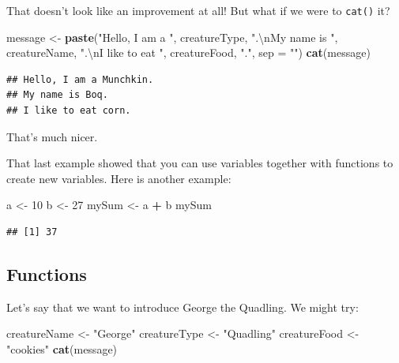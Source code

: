 \documentclass[]{book}
\makeatletter
\newenvironment{Shaded}{\begin{snugshade}}{\end{snugshade}}
\newcommand{\KeywordTok}[1]{\textcolor[rgb]{0.13,0.29,0.53}{\textbf{#1}}}
\newcommand{\DataTypeTok}[1]{\textcolor[rgb]{0.13,0.29,0.53}{#1}}
\newcommand{\DecValTok}[1]{\textcolor[rgb]{0.00,0.00,0.81}{#1}}
\newcommand{\CharTok}[1]{\textcolor[rgb]{0.31,0.60,0.02}{#1}}
\newcommand{\StringTok}[1]{\textcolor[rgb]{0.31,0.60,0.02}{#1}}
\newcommand{\OperatorTok}[1]{\textcolor[rgb]{0.81,0.36,0.00}{\textbf{#1}}}
\newcommand{\NormalTok}[1]{#1}
\newenvironment{kframe}{%
\medskip{}
\setlength{\fboxsep}{.8em}
 \def\at@end@of@kframe{}%
 \ifinner\ifhmode%
  \def\at@end@of@kframe{\end{minipage}}%
  \begin{minipage}{\columnwidth}%
 \fi\fi%
 \def\FrameCommand##1{\hskip\@totalleftmargin \hskip-\fboxsep
 \colorbox{shadecolor}{##1}\hskip-\fboxsep
     \hskip-\linewidth \hskip-\@totalleftmargin \hskip\columnwidth}%
 \MakeFramed {\advance\hsize-\width
   \@totalleftmargin\z@ \linewidth\hsize
   \@setminipage}}%
 {\par\unskip\endMakeFramed%
 \at@end@of@kframe}
\renewenvironment{Shaded}{\begin{kframe}}{\end{kframe}}
\theoremstyle{definition}
\theoremstyle{definition}
\theoremstyle{definition}
\theoremstyle{remark}
\makeatother
\begin{document}
That doesn't look like an improvement at all! But what if we were to
\texttt{cat()} it?

\begin{Shaded}
\begin{Highlighting}[]
\NormalTok{message <-}\StringTok{ }\KeywordTok{paste}\NormalTok{(}\StringTok{"Hello, I am a "}\NormalTok{,}
\NormalTok{                 creatureType,}
                 \StringTok{".}\CharTok{\textbackslash{}n}\StringTok{My name is "}\NormalTok{,}
\NormalTok{                 creatureName,}
                 \StringTok{".}\CharTok{\textbackslash{}n}\StringTok{I like to eat "}\NormalTok{,}
\NormalTok{                 creatureFood,}
                 \StringTok{"."}\NormalTok{,}
                 \DataTypeTok{sep =} \StringTok{""}\NormalTok{)}
\KeywordTok{cat}\NormalTok{(message)}
\end{Highlighting}
\end{Shaded}

\begin{verbatim}
## Hello, I am a Munchkin.
## My name is Boq.
## I like to eat corn.
\end{verbatim}

That's much nicer.

That last example showed that you can use variables together with
functions to create new variables. Here is another example:

\begin{Shaded}
\begin{Highlighting}[]
\NormalTok{a <-}\StringTok{ }\DecValTok{10}
\NormalTok{b <-}\StringTok{ }\DecValTok{27}
\NormalTok{mySum <-}\StringTok{ }\NormalTok{a }\OperatorTok{+}\StringTok{ }\NormalTok{b}
\NormalTok{mySum}
\end{Highlighting}
\end{Shaded}

\begin{verbatim}
## [1] 37
\end{verbatim}

\subsection{Functions}\label{idea-functions}

Let's say that we want to introduce George the Quadling. We might try:

\begin{Shaded}
\begin{Highlighting}[]
\NormalTok{creatureName <-}\StringTok{ "George"}
\NormalTok{creatureType <-}\StringTok{ "Quadling"}
\NormalTok{creatureFood <-}\StringTok{ "cookies"}
\KeywordTok{cat}\NormalTok{(message)}
\end{Highlighting}
\end{Shaded}
\end{document}
